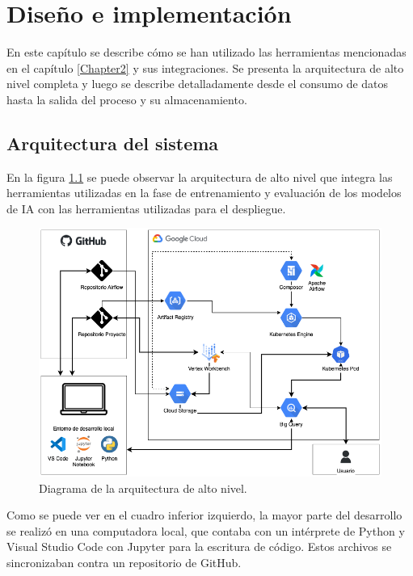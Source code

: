 \chapter{Diseño e implementación} %

\label{Chapter3} %


En este capítulo se describe cómo se han utilizado las herramientas mencionadas en el capítulo \ref{Chapter2} y sus integraciones. Se presenta la arquitectura de alto nivel completa y luego se describe detalladamente desde el consumo de datos hasta la salida del proceso y su almacenamiento.


\section{Arquitectura del sistema}

En la figura \ref{fig:arqsistema} se puede observar la arquitectura de alto nivel que integra las herramientas utilizadas en la fase de entrenamiento y evaluación de los modelos de IA con las herramientas utilizadas para el despliegue.

\begin{figure}[htbp]
	\centering
	\includegraphics[width=1\textwidth]{./Figures/arq-sistema.png}
	\caption{Diagrama de la arquitectura de alto nivel.}
	\label{fig:arqsistema}
\end{figure}

Como se puede ver en el cuadro inferior izquierdo, la mayor parte del desarrollo se realizó en una computadora local, que contaba con un intérprete de Python y Visual Studio Code con Jupyter para la escritura de código. Estos archivos se sincronizaban contra un repositorio de GitHub.

